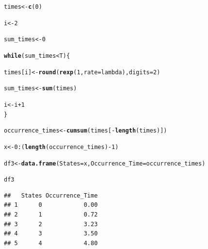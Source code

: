 \documentclass[11pt, a4paper]{article}\usepackage[]{graphicx}\usepackage[]{xcolor}
\makeatletter
\newcommand{\hlnum}[1]{\textcolor[rgb]{0.686,0.059,0.569}{#1}}%
\newcommand{\hlopt}[1]{\textcolor[rgb]{0,0,0}{#1}}%
\newcommand{\hldef}[1]{\textcolor[rgb]{0.345,0.345,0.345}{#1}}%
\newcommand{\hlkwa}[1]{\textcolor[rgb]{0.161,0.373,0.58}{\textbf{#1}}}%
\newcommand{\hlkwb}[1]{\textcolor[rgb]{0.69,0.353,0.396}{#1}}%
\newcommand{\hlkwc}[1]{\textcolor[rgb]{0.333,0.667,0.333}{#1}}%
\newcommand{\hlkwd}[1]{\textcolor[rgb]{0.737,0.353,0.396}{\textbf{#1}}}%
\newenvironment{kframe}{%
 \def\at@end@of@kframe{}%
 \ifinner\ifhmode%
  \def\at@end@of@kframe{\end{minipage}}%
  \begin{minipage}{\columnwidth}%
 \fi\fi%
 \def\FrameCommand##1{\hskip\@totalleftmargin \hskip-\fboxsep
 \colorbox{shadecolor}{##1}\hskip-\fboxsep
     \hskip-\linewidth \hskip-\@totalleftmargin \hskip\columnwidth}%
 \MakeFramed {\advance\hsize-\width
   \@totalleftmargin\z@ \linewidth\hsize
   \@setminipage}}%
 {\par\unskip\endMakeFramed%
 \at@end@of@kframe}
\newenvironment{knitrout}{}{} %
\makeatother
\begin{document}
\begin{knitrout}
\color{fgcolor}\begin{kframe}
\begin{alltt}
\hldef{times} \hlkwb{<-} \hlkwd{c}\hldef{(}\hlnum{0}\hldef{)}

\hldef{i} \hlkwb{<-} \hlnum{2}

\hldef{sum_times} \hlkwb{<-} \hlnum{0}

\hlkwa{while}\hldef{(sum_times} \hlopt{<} \hldef{T)\{}

  \hldef{times[i]} \hlkwb{<-} \hlkwd{round}\hldef{(}\hlkwd{rexp}\hldef{(}\hlnum{1}\hldef{,} \hlkwc{rate} \hldef{= lambda),} \hlkwc{digits} \hldef{=} \hlnum{2}\hldef{)}

  \hldef{sum_times} \hlkwb{<-} \hlkwd{sum}\hldef{(times)}

  \hldef{i} \hlkwb{<-} \hldef{i} \hlopt{+} \hlnum{1}
\hldef{\}}

\hldef{occurrence_times} \hlkwb{<-} \hlkwd{cumsum}\hldef{(times[}\hlopt{-}\hlkwd{length}\hldef{(times)])}

\hldef{x} \hlkwb{<-} \hlnum{0}\hlopt{:}\hldef{(}\hlkwd{length}\hldef{(occurrence_times)}\hlopt{-}\hlnum{1}\hldef{)}
\end{alltt}
\end{kframe}
\end{knitrout}

\begin{knitrout}
\color{fgcolor}\begin{kframe}
\begin{alltt}
\hldef{df3} \hlkwb{<-} \hlkwd{data.frame}\hldef{(}\hlkwc{States} \hldef{= x,} \hlkwc{Occurrence_Time} \hldef{= occurrence_times)}
\end{alltt}
\end{kframe}
\end{knitrout}

\begin{knitrout}
\color{fgcolor}\begin{kframe}
\begin{alltt}
\hldef{df3}
\end{alltt}
\begin{verbatim}
##   States Occurrence_Time
## 1      0            0.00
## 2      1            0.72
## 3      2            3.23
## 4      3            3.50
## 5      4            4.80
\end{verbatim}
\end{kframe}
\end{knitrout}
\end{document}
